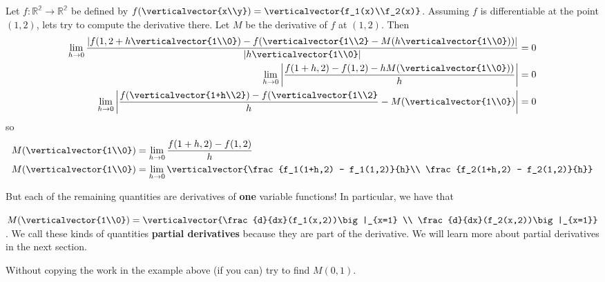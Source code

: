 \documentclass{ximera}
\begin{document}
\begin{example}
	Let $f:\mathbb{R^2} \to \mathbb{R^2}$ be defined by $f(\verticalvector{x\\y}) = \verticalvector{f_1(x)\\f_2(x)}$. 
	 Assuming $f$ is differentiable at the point $(1,2)$, lets try to compute the derivative there. 
	 Let $M$ be the derivative of $f$ at $(1,2)$.  Then 
	 \begin{align*}\lim_{h \to 0} \frac{\left|f(1,2+h\verticalvector{1\\0}) - f(\verticalvector{1\\2} - M(h\verticalvector{1\\0}))\right|}{\left|h\verticalvector{1\\0}\right|} &= 0\\
	  \lim_{h \to 0}\left| \frac{f(1+h,2) - f(1,2) - hM(\verticalvector{1\\0}))}{h} \right| &= 0\\
	  \lim_{h \to 0}\left| \frac{f(\verticalvector{1+h\\2}) - f(\verticalvector{1\\2}}{h} -M(\verticalvector{1\\0})\right| &= 0
	  \end{align*}
	  so
	  \begin{align*}
	  M(\verticalvector{1\\0}) &= \lim_{ h \to 0 } \frac{f(1+h,2) - f(1,2)}{h}\\
	  M(\verticalvector{1\\0}) &= \lim_{ h \to 0 } \verticalvector{\frac{f_1(1+h,2) - f_1(1,2)}{h}\\ \frac{f_2(1+h,2) - f_2(1,2)}{h}}
	 \end{align*}
	 
	 But each of the remaining quantities are derivatives of \textbf{one} variable functions!  In particular, we have that
	 
	 $M(\verticalvector{1\\0}) = \verticalvector{\frac{d}{dx}(f_1(x,2))\big|_{x=1} \\ \frac{d}{dx}(f_2(x,2))\big|_{x=1}}$.  
	 We call these kinds of quantities \textbf{partial derivatives}  because they are part of the derivative.  We will learn more about partial derivatives in the next section.
\end{example}

	Without copying the work in the example above (if you can) try to find $M(0,1)$.
	
\end{document}
